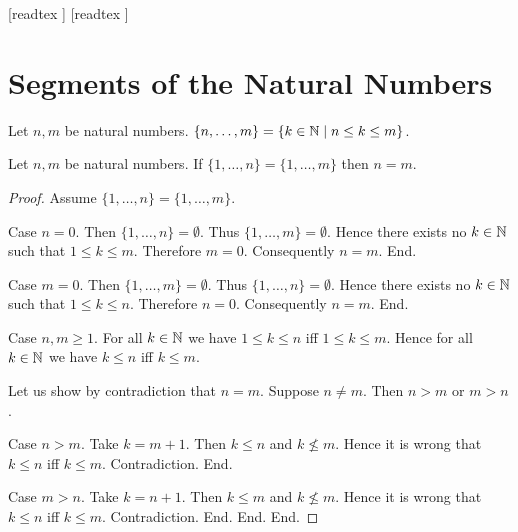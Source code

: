 \documentclass[10pt]{article}
\begin{document}
  \begin{imports}
    \begin{forthel}
      [readtex ]
      [readtex ]
    \end{forthel}
  \end{imports}


  \section{Segments of the Natural Numbers}

  \begin{forthel}
    \begin{definition}
      Let $n, m$ be natural numbers.
      $\{ n, \dots, m \} = \{ k \in \mathbb{N} \mid n \leq k \leq m \}$.
    \end{definition}
  \end{forthel}

  \begin{forthel}
    \begin{proposition}
      Let $n, m$ be natural numbers.
      If $\{ 1, \dots, n \} = \{ 1, \dots, m \}$ then $n = m$.
    \end{proposition}
    \begin{proof}
      Assume $\{ 1, \dots, n \} = \{ 1, \dots, m \}$.

      Case $n = 0$.
        Then $\{ 1, \dots, n \} = \emptyset$.
        Thus $\{ 1, \dots, m \} = \emptyset$.
        Hence there exists no $k \in \mathbb{N}$ such that $1 \leq k \leq m$.
        Therefore $m = 0$.
        Consequently $n = m$.
      End.

      Case $m = 0$.
        Then $\{ 1, \dots, m \} = \emptyset$.
        Thus $\{ 1, \dots, n \} = \emptyset$.
        Hence there exists no $k \in \mathbb{N}$ such that $1 \leq k \leq n$.
        Therefore $n = 0$.
        Consequently $n = m$.
      End.

      Case $n, m \geq 1$.
        For all $k \in \mathbb{N}$ we have $1 \leq k \leq n$ iff $1 \leq k \leq m$.
        Hence for all $k \in \mathbb{N}$ we have $k \leq n$ iff $k \leq m$.

        Let us show by contradiction that $n = m$.
          Suppose $n \neq m$.
          Then $n > m$ or $m > n$.

          Case $n > m$.
            Take $k = m + 1$.
            Then $k \leq n$ and $k \nleq m$.
            Hence it is wrong that $k \leq n$ iff $k \leq m$.
            Contradiction.
          End.

          Case $m > n$.
            Take $k = n + 1$.
            Then $k \leq m$ and $k \nleq m$.
            Hence it is wrong that $k \leq n$ iff $k \leq m$.
            Contradiction.
          End.
        End.
      End.
    \end{proof}
  \end{forthel}
\end{document}
